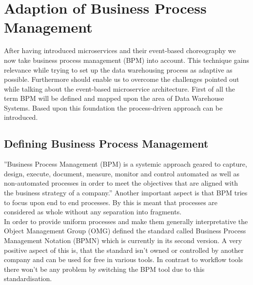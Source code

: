 \section{Adaption of Business Process Management}
\label{sec:bpm}
After having introduced microservices and their event-based choreography we now take business process management (BPM) into account. This technique gains relevance while trying to set up the data warehousing process as adaptive as possible. Furthermore should enable us to overcome the challenges pointed out while talking about the event-based microservice architecture.\newline
First of all the term BPM will be defined and mapped upon the area of Data Warehouse Systems. Based upon this foundation the process-driven approach can be introduced. 

\subsection{Defining Business Process Management}
''Business Process Management (BPM) is a systemic approach geared to capture, design, execute, document, measure, monitor and control automated as well as non-automated processes in order to meet the objectives that are aligned with the business strategy of a company.'' \cite{bpmDef} Another important aspect is that BPM tries to focus upon end to end processes. By this is meant that processes are considered as whole without any separation into fragments.\cite{praxisBPM}\newline
\\
In order to provide uniform processes and make them generally interpretative the Object Management Group (OMG) defined the standard called Business Process Management Notation (BPMN) which is currently in its second version. A very positive aspect of this is, that the standard isn't owned or controlled by another company and can be used for free in various tools. In contrast to workflow tools there won't be any problem by switching the BPM tool due to this standardisation. \cite{bpmMethodStyle}


